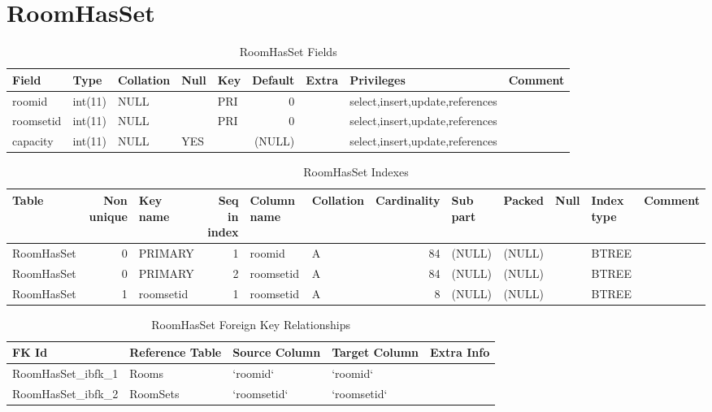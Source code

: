 \documentclass[captions=tablesignature]{scrartcl}
\begin{document}
\section{RoomHasSet}
\label{sec-21}

\begin{table}[htb]
\caption{\label{tbl:roomhassetfields}RoomHasSet Fields}
\centering
\begin{tabular}{lllllrlll}
\hline
Field & Type & Collation & Null & Key & Default & Extra & Privileges & Comment\\
\hline
roomid & int(11) & NULL &  & PRI & 0 &  & select,insert,update,references & \\
roomsetid & int(11) & NULL &  & PRI & 0 &  & select,insert,update,references & \\
capacity & int(11) & NULL & YES &  & (NULL) &  & select,insert,update,references & \\
\hline
\end{tabular}
\end{table}

\begin{table}[htb]
\caption{\label{tbl:roomhassetindexes}RoomHasSet Indexes}
\centering
\begin{tabular}{lrlrllrlllll}
\hline
Table & Non unique & Key name & Seq in index & Column name & Collation & Cardinality & Sub part & Packed & Null & Index type & Comment\\
\hline
RoomHasSet & 0 & PRIMARY & 1 & roomid & A & 84 & (NULL) & (NULL) &  & BTREE & \\
RoomHasSet & 0 & PRIMARY & 2 & roomsetid & A & 84 & (NULL) & (NULL) &  & BTREE & \\
RoomHasSet & 1 & roomsetid & 1 & roomsetid & A & 8 & (NULL) & (NULL) &  & BTREE & \\
\hline
\end{tabular}
\end{table}

\begin{table}[htb]
\caption{\label{tbl:roomhassetfkr}RoomHasSet Foreign Key Relationships}
\centering
\begin{tabular}{lllll}
\hline
FK Id & Reference Table & Source Column & Target Column & Extra Info\\
\hline
RoomHasSet\_ibfk\_1 & Rooms & `roomid` & `roomid` & \\
RoomHasSet\_ibfk\_2 & RoomSets & `roomsetid` & `roomsetid` & \\
\hline
\end{tabular}
\end{table}
\end{document}
